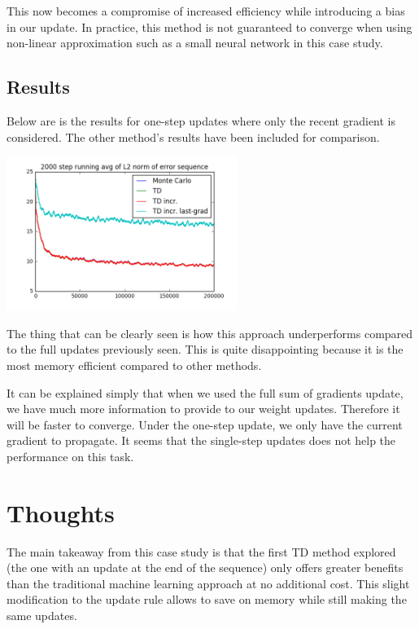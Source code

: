 \documentclass{article}
\begin{document}
This now becomes a compromise of increased efficiency while introducing a bias in our update. In practice, this method is not guaranteed to converge when using non-linear approximation such as a small neural network in this case study.

\subsection{Results}

Below are is the results for one-step updates where only the recent gradient is considered. The other method's results have been included for comparison.

\begin{center}
  \includegraphics[width=75mm]{figures/plot_TD_last_grad_L2_norm_error.png}
\end{center}

The thing that can be clearly seen is how this approach underperforms compared to the full updates previously seen. This is quite disappointing because it is the most memory efficient compared to other methods.

It can be explained simply that when we used the full sum of gradients update, we have much more information to provide to our weight updates. Therefore it will be faster to converge. Under the one-step update, we only have the current gradient to propagate. It seems that the single-step updates does not help the performance on this task.

\section{Thoughts}

The main takeaway from this case study is that the first TD method explored (the one with an update at the end of the sequence) only offers greater benefits than the traditional machine learning approach at no additional cost. This slight modification to the update rule allows to save on memory while still making the same updates.
\end{document}
